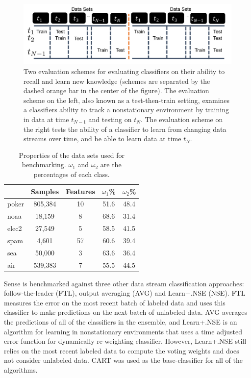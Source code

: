 \documentclass[10pt, conference]{IEEEtran}
\begin{document}
\begin{figure}
\centering
\includegraphics[width=\textwidth]{procedure.pdf}
\caption{Two evaluation schemes for evaluating classifiers on their ability to recall and learn new knowledge (schemes are separated by the dashed orange bar in the center of the figure). The evaluation scheme on the left, also known as a test-then-train setting, examines a classifiers ability to track a nonstationary environment by training in data at time $t_{N-1}$ and testing on $t_N$. The evaluation scheme on the right tests the ability of a classifier to learn from changing data streams over time, and be able to learn data at time $t_N$.}\label{fig:procedure.pdf}
\end{figure}


\begin{table}
\caption{Properties of the data sets used for benchmarking. $\omega_1$ and $\omega_2$ are the percentages of each class.}\label{tab:data}
\begin{center}
\begin{tabular}{|l || c c c c |}
\hline
 & Samples & Features & $\omega_1$\% & $\omega_2$\% \\
\hline
\hline
poker & 805,384 & 10 & 51.6 & 48.4\\
noaa & 18,159 & 8 & 68.6 & 31.4\\
elec2 & 27,549 & 5 & 58.5  & 41.5\\
spam & 4,601 & 57 & 60.6  &39.4 \\
sea & 50,000 & 3 & 63.6 & 36.4\\
air & 539,383 & 7 & 55.5 & 44.5\\
\hline
\end{tabular}
\end{center}
\end{table}

Sense is benchmarked against three other data stream classification approaches: follow-the-leader (FTL), output averaging (AVG) and Learn\++.NSE (NSE). FTL measures the error on the most recent batch of labeled data and uses this classifier to make predictions on the next batch of unlabeled data. AVG averages the predictions of all of the classifiers in the ensemble, and Learn\++.NSE is an algorithm for learning in nonstationary environments that uses a time adjusted error function for dynamically re-weighting classifier. However, Learn\++.NSE still relies on the most recent labeled data to compute the voting weights and does not consider unlabeled data. 
CART was used as the base-classifier for all of the algorithms. 
\end{document}
